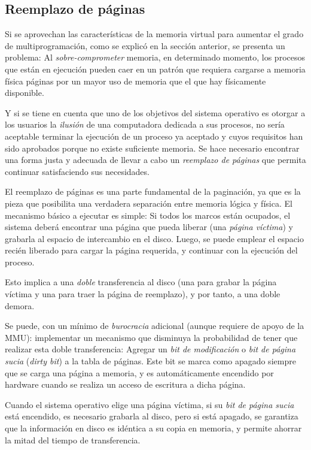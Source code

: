 \documentclass[11pt,fleqn]{book} %
\begin{document}
\subsection{Reemplazo de páginas}
\label{sec-5-5-3}


Si se aprovechan las características de la memoria virtual para
aumentar el grado de multiprogramación, como se explicó en la sección
anterior, se presenta un problema: Al \emph{sobre-comprometer} memoria,
en determinado momento, los procesos que están en ejecución pueden
caer en un patrón que requiera cargarse a memoria física páginas por
un mayor uso de memoria que el que hay físicamente disponible.

Y si se tiene en cuenta que uno de los objetivos del sistema operativo es
otorgar a los usuarios la \emph{ilusión} de una computadora dedicada a sus
procesos, no sería aceptable terminar la ejecución de un proceso ya
aceptado y cuyos requisitos han sido aprobados porque no existe suficiente
memoria. Se hace necesario encontrar una forma justa y adecuada de
llevar a cabo un \emph{reemplazo de páginas} que permita continuar
satisfaciendo sus necesidades.

El reemplazo de páginas es una parte fundamental de la paginación, 
ya que es la pieza que posibilita una verdadera separación
entre memoria lógica y física. El mecanismo básico a ejecutar es simple: 
Si todos los marcos están ocupados, el sistema deberá encontrar una página 
que pueda liberar (una \emph{página víctima}) y grabarla al espacio de 
intercambio en el disco. Luego, se puede emplear el espacio recién
liberado para cargar la página requerida, y continuar con la ejecución
del proceso.

Esto implica a una \emph{doble} transferencia al disco (una para grabar
la página víctima y una para traer la página de reemplazo), y por
tanto, a una doble demora.

Se puede, con un mínimo de \emph{burocracia} adicional (aunque requiere de
apoyo de la MMU): implementar un mecanismo que disminuya la probabilidad
de tener que realizar esta doble transferencia: Agregar un \emph{bit de modificación} o \emph{bit de página sucia} (\emph{dirty bit}) a la tabla de
páginas. Este bit se marca como apagado siempre que se carga una
página a memoria, y es automáticamente encendido por hardware cuando se realiza un
acceso de escritura a dicha página.

Cuando el sistema operativo elige una página víctima, si su \emph{bit de página sucia} está encendido, es necesario grabarla al disco, pero si
está apagado, se garantiza que la información en disco es idéntica  a su copia en 
memoria, y permite ahorrar la mitad del tiempo de transferencia.
\end{document}
